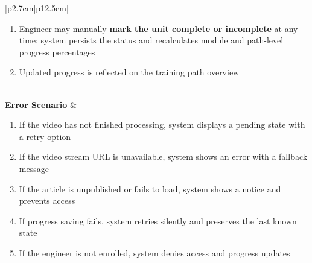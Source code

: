 \begin{table}[H]
\begin{tabular}{|p{2.7cm}|p{12.5cm}|}
\begin{minipage}[t]{\linewidth}
\begin{enumerate}[topsep=0pt,itemsep=1pt,parsep=0pt,partopsep=0pt]
                                                    engineer scrolls through the content; system tracks progress via scroll
                                                    position or explicit confirmation; upon reaching the end the article is marked
                                                    as read
                                              \item Engineer may manually \textbf{mark the unit complete or incomplete} at any
                                                    time; system persists the status and recalculates module and path-level
                                                    progress percentages
                                              \item Updated progress is reflected on the training path overview
                                          \end{enumerate}
                                      \end{minipage}                                                            \\
            \hline
            \textbf{Error Scenario} & \begin{minipage}[t]{\linewidth}
                                          \begin{enumerate}[topsep=0pt,itemsep=1pt,parsep=0pt,partopsep=0pt]
                                              \item If the video has not finished processing, system displays a pending state with
                                                    a retry option
                                              \item If the video stream URL is unavailable, system shows an error with a fallback
                                                    message
                                              \item If the article is unpublished or fails to load, system shows a notice and
                                                    prevents access
                                              \item If progress saving fails, system retries silently and preserves the last known
                                                    state
                                              \item If the engineer is not enrolled, system denies access and progress updates
                                          \end{enumerate}
                                      \end{minipage}                                                            \\
            \hline
        \end{tabular}
        \label{tab:eng-consume-content}
    \end{table}

